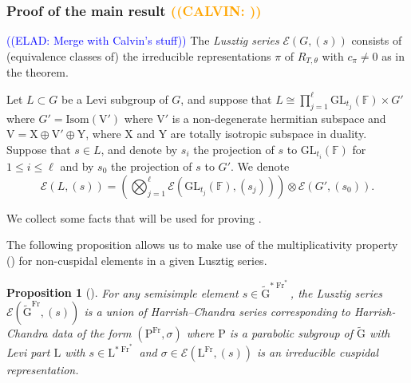 \documentclass[12pt, reqno]{amsart}
\newtheorem{proposition}[theorem]{Proposition}
\theoremstyle{definition}
\theoremstyle{definition}
\theoremstyle{definition}
\newcommand{\hermitianSpace}{\mathrm{V}}
\newcommand{\xIsotropic}{\mathrm{X}}
\newcommand{\yIsotropic}{\mathrm{Y}}
\newcommand{\GL}{\mathrm{GL}}
\newcommand{\GroupExtension}[1]{\widetilde{#1}}
\newcommand{\finiteField}{\mathbb{F}}
\newcommand{\Frobenius}{\operatorname{Fr}}
\newcommand{\IsometryGroup}{\mathrm{Isom}}
\newcommand{\algebraicGroup}[1]{\boldsymbol{\mathrm{#1}}}
\newcommand{\LusztigSeries}[2]{\mathcal{E}\left(#1, (#2)\right)}
\newcommand{\DualFrobeniusFixedPoints}[2][\Frobenius^{\ast}]{\algebraicGroup{#2}^{\ast #1}}
\newcommand{\FrobeniusFixedPoints}[2][\Frobenius]{\algebraicGroup{#2}^{#1}}
\newcommand{\calvin}[1]{\textcolor{orange}{\sffamily ((CALVIN: #1))}}
\newcommand{\elad}[1]{\textcolor{blue}{\sffamily ((ELAD: #1))}}
\begin{document}
\subsubsection{Proof of the main result \calvin{}}

\elad{Merge with Calvin's stuff}
The \emph{Lusztig series} $\LusztigSeries{G}{s}$ consists of (equivalence classes of) the irreducible representations $\pi$ of $R_{T, \theta}$ with $c_{\pi} \ne 0$ as in the theorem.

Let $L \subset G$ be a Levi subgroup of $G$, and suppose that $L \cong \prod_{j=1}^\ell \GL_{t_j}\left(\finiteField\right) \times G'$ where $G' = \IsometryGroup\left(\hermitianSpace'\right)$ where $\hermitianSpace'$ is a non-degenerate hermitian subspace and $\hermitianSpace = \xIsotropic \oplus \hermitianSpace' \oplus \yIsotropic$, where $\xIsotropic$ and $\yIsotropic$ are totally isotropic subspace in duality. Suppose that $s \in L$, and denote by $s_i$ the projection of $s$ to $\GL_{t_i}\left(\finiteField\right)$ for $1 \le i \le \ell$ and by $s_0$ the projection of $s$ to $G'$. We denote
$$\LusztigSeries{L}{s} = \left(\bigotimes_{j=1}^{\ell} \LusztigSeries{\GL_{t_j}\left(\finiteField\right)}{s_j}\right) \otimes \LusztigSeries{G'}{s_0}.$$

We collect some facts that will be used for proving .

The following proposition allows us to make use of the multiplicativity property () for non-cuspidal elements in a given Lusztig series.
\begin{proposition}[{\cite[Proof of Corollary 3.3.21]{GeckMalle2020}}]
	For any semisimple element $s \in \DualFrobeniusFixedPoints{\GroupExtension{G}}$, the Lusztig series $\LusztigSeries{\FrobeniusFixedPoints{\GroupExtension{G}}}{s}$ is a union of Harrish--Chandra series corresponding to Harrish-Chandra data of the form $\left(\FrobeniusFixedPoints{\algebraicGroup{P}},\sigma\right)$ where $\algebraicGroup{P}$ is a parabolic subgroup of $\algebraicGroup{\GroupExtension{G}}$ with Levi part $\algebraicGroup{L}$ with $s \in \DualFrobeniusFixedPoints{L}$ and $\sigma \in \LusztigSeries{\FrobeniusFixedPoints{L}}{s}$ is an irreducible cuspidal representation.
\end{proposition}
\end{document}
